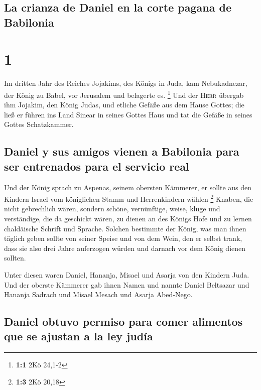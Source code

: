 \hypertarget{la-crianza-de-daniel-en-la-corte-pagana-de-babilonia}{%
\subsection{La crianza de Daniel en la corte pagana de
Babilonia}\label{la-crianza-de-daniel-en-la-corte-pagana-de-babilonia}}

\hypertarget{section}{%
\section{1}\label{section}}

 Im dritten Jahr des Reiches Jojakims, des Königs in Juda,
kam Nebukadnezar, der König zu Babel, vor Jerusalem und belagerte es.
\footnote{\textbf{1:1} 2Kö 24,1-2}  Und der \textsc{Herr}
übergab ihm Jojakim, den König Judas, und etliche Gefäße aus dem Hause
Gottes; die ließ er führen ins Land Sinear in seines Gottes Haus und tat
die Gefäße in seines Gottes Schatzkammer.

\hypertarget{daniel-y-sus-amigos-vienen-a-babilonia-para-ser-entrenados-para-el-servicio-real}{%
\subsection{Daniel y sus amigos vienen a Babilonia para ser entrenados
para el servicio
real}\label{daniel-y-sus-amigos-vienen-a-babilonia-para-ser-entrenados-para-el-servicio-real}}

 Und der König sprach zu Aspenas, seinem obersten
Kämmerer, er sollte aus den Kindern Israel vom königlichen Stamm und
Herrenkindern wählen \footnote{\textbf{1:3} 2Kö 20,18} 
Knaben, die nicht gebrechlich wären, sondern schöne, vernünftige, weise,
kluge und verständige, die da geschickt wären, zu dienen an des Königs
Hofe und zu lernen chaldäische Schrift und Sprache. 
Solchen bestimmte der König, was man ihnen täglich geben sollte von
seiner Speise und von dem Wein, den er selbst trank, dass sie also drei
Jahre auferzogen würden und darnach vor dem König dienen sollten.

 Unter diesen waren Daniel, Hananja, Misael und Asarja von
den Kindern Juda.  Und der oberste Kämmerer gab ihnen
Namen und nannte Daniel Beltsazar und Hananja Sadrach und Misael Mesach
und Asarja Abed-Nego.

\hypertarget{daniel-obtuvo-permiso-para-comer-alimentos-que-se-ajustan-a-la-ley-juduxeda}{%
\subsection{Daniel obtuvo permiso para comer alimentos que se ajustan a
la ley
judía}\label{daniel-obtuvo-permiso-para-comer-alimentos-que-se-ajustan-a-la-ley-juduxeda}}

